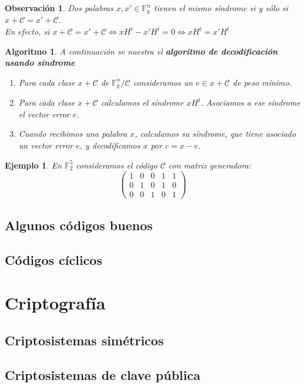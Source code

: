 \documentclass[spanish]{book}
\newtheorem{alg}{Algoritmo}
\newtheorem{ejem}{Ejemplo}
\newtheorem{obsv}{Observación}
\begin{document}
\begin{obsv}
	Dos palabras $x, x' \in \mathbb{F}_q^n$ tienen el mismo síndrome si y sólo si $x + \mathcal{C}=x'+\mathcal{C}$. \\
	En efecto, si $x+\mathcal{C}=x'+\mathcal{C} \Longleftrightarrow xH^t-x'H^t=0 \Longleftrightarrow xH^t=x'H^t$
\end{obsv}

\begin{alg}
	A continuación se nuestra el \textbf{algoritmo de decodificación usando síndrome}
	\begin{enumerate}
		\item Para cada clase $x+\mathcal{C}$ de $\mathbb{F}_q^n/\mathcal{C}$ consideramos un $e \in x+\mathcal{C}$ de peso mínimo.
		\item Para cada clase $x+\mathcal{C}$ calculamos el síndrome $xH^t$. Asociamos a ese síndrome el vector error $e$.
		\item Cuando recibimos una palabra $x$, calculamos su síndrome, que tiene asociado un vector error $e$, y decodificamos $x$ por $c=x-e$.
	\end{enumerate}
\end{alg}

\begin{ejem}
	En $\mathbb{F}_2^5$ consideramos el código $\mathcal{C}$ con matriz generadora:
		$$
		\left(
		\begin{array}{ccccc}
		1 & 0 & 0 & 1 & 1 \\
		0 & 1 & 0 & 1 & 0 \\
		0 & 0 & 1 & 0 & 1
		\end{array} \right)
		$$
\end{ejem}
\section{Algunos códigos buenos}
\section{Códigos cíclicos}

\chapter{Criptografía}
\section{Criptosistemas simétricos}
\section{Criptosistemas de clave pública}
\end{document}
